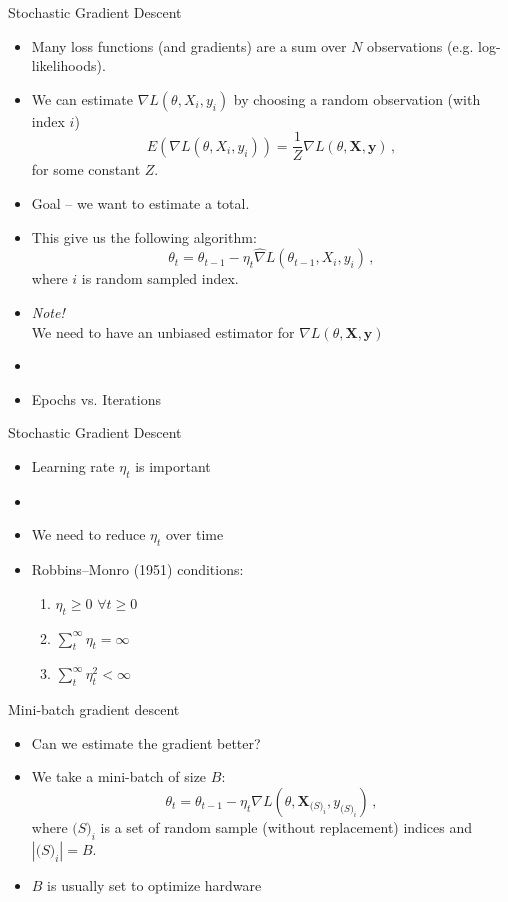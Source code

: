 \documentclass[10pt]{beamer}
\begin{document}
\begin{frame}{Stochastic Gradient Descent}


\begin{itemize}
\item Many loss functions (and gradients) are a sum over $N$ observations (e.g. log-likelihoods).
\item We can estimate $\nabla L(\theta, X_{i}, y_{i})$ by choosing a random observation (with index $i$)
\[
E(\nabla L(\theta, X_{i}, y_{i})) = \frac{1}{Z} \nabla L(\theta, \mathbf{X}, \mathbf{y})\,,
\]
for some constant $Z$.
\item Goal -- we want to estimate a total.
\item This give us the following algorithm:
\[
\theta_t = \theta_{t-1} - \eta_t \hat{\nabla} L(\theta_{t-1}, X_{i}, y_{i})\,,
\]
where $i$ is random sampled index.
\item \emph{Note!} \\We need to have an unbiased estimator for $\nabla L(\theta, \mathbf{X}, \mathbf{y})$
\item {}\pause
\item Epochs vs. Iterations
\end{itemize}


\end{frame}


\begin{frame}{Stochastic Gradient Descent}


\begin{itemize}
\item Learning rate $\eta_t$ is important
\item {}\pause
\item We need to reduce $\eta_t$ over time
\item Robbins–Monro (1951) conditions:
\begin{enumerate}
\item $\eta_t \geq 0$ $\forall t \geq 0$
\item $\sum^\infty_t \eta_t = \infty$
\item $\sum^\infty_t \eta_t^2 < \infty$
\end{enumerate}
\end{itemize}

\end{frame}


\begin{frame}{Mini-batch gradient descent}

\begin{itemize}
\item Can we estimate the gradient better?\pause
\item We take a mini-batch of size $B$:
\[
\theta_t = \theta_{t-1} - \eta_t \nabla L(\theta, \mathbf{X}_{\mathcal(S)_i}, y_{\mathcal(S)_i})\,,
\]
where $\mathcal(S)_i$ is a set of random sample (without replacement) indices and $|\mathcal(S)_i| = B$.
\item $B$ is usually set to optimize hardware
\end{itemize}

\end{frame}
\end{document}

